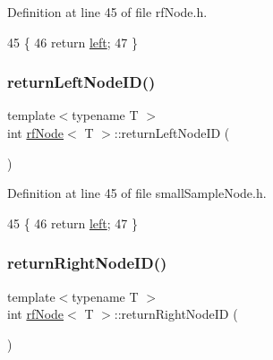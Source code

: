 Definition at line 45 of file rf\+Node.\+h.


\begin{DoxyCode}
45                                      \{
46             \textcolor{keywordflow}{return} \hyperlink{classrfNode_ac8e195fc3d8a9647f10a42153d76119f}{left};    
47         \}
\end{DoxyCode}
\mbox{\label{classrfNode_a97148e8fd84a37471ab7ad5e7bdc12a4}} 
\subsubsection{\texorpdfstring{return\+Left\+Node\+I\+D()}{returnLeftNodeID()}\hspace{0.1cm}{\footnotesize\ttfamily [2/2]}}
{\footnotesize\ttfamily template$<$typename T $>$ \\
int \hyperlink{classrfNode}{rf\+Node}$<$ T $>$\+::return\+Left\+Node\+ID (\begin{DoxyParamCaption}{ }\end{DoxyParamCaption})\hspace{0.3cm}{\ttfamily [inline]}}



Definition at line 45 of file small\+Sample\+Node.\+h.


\begin{DoxyCode}
45                                      \{
46             \textcolor{keywordflow}{return} \hyperlink{classrfNode_ac8e195fc3d8a9647f10a42153d76119f}{left};    
47         \}
\end{DoxyCode}
\mbox{\label{classrfNode_aef5c965bd9810b3573057d611dcca7f5}} 
\subsubsection{\texorpdfstring{return\+Right\+Node\+I\+D()}{returnRightNodeID()}\hspace{0.1cm}{\footnotesize\ttfamily [1/2]}}
{\footnotesize\ttfamily template$<$typename T $>$ \\
int \hyperlink{classrfNode}{rf\+Node}$<$ T $>$\+::return\+Right\+Node\+ID (\begin{DoxyParamCaption}{ }\end{DoxyParamCaption})\hspace{0.3cm}{\ttfamily [inline]}}



